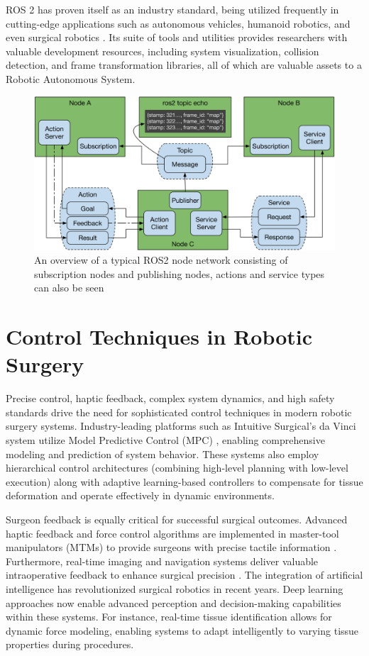 ROS 2 has proven itself as an industry standard, being utilized frequently in cutting-edge applications such as autonomous vehicles, humanoid robotics, and even surgical robotics \cite{Chen2013OpenSource}. Its suite of tools and utilities provides researchers with valuable development resources, including system visualization, collision detection, and frame transformation libraries, all of which are valuable assets to a Robotic Autonomous System.


\begin{figure}[H]
    \centering
    \includegraphics[width=1\linewidth]{figures/ROS2.png}
    \caption{An overview of a typical ROS2 node network consisting of subscription nodes and publishing nodes, actions and service types can also be seen \cite{doi:10.1126/scirobotics.abm6074}}
    \label{fig:ROS2}
\end{figure}


\section{Control Techniques in Robotic Surgery}

Precise control, haptic feedback, complex system dynamics, and high safety standards drive the need for sophisticated control techniques in modern robotic surgery systems. Industry-leading platforms such as Intuitive Surgical's da Vinci system utilize Model Predictive Control (MPC) \cite{Kazanzides2014DVRK}, enabling comprehensive modeling and prediction of system behavior. These systems also employ hierarchical control architectures (combining high-level planning with low-level execution) along with adaptive learning-based controllers to compensate for tissue deformation and operate effectively in dynamic environments.

Surgeon feedback is equally critical for successful surgical outcomes. Advanced haptic feedback and force control algorithms are implemented in master-tool manipulators (MTMs) to provide surgeons with precise tactile information \cite{Okamura2001HapticSurgery}. Furthermore, real-time imaging and navigation systems deliver valuable intraoperative feedback to enhance surgical precision \cite{Maier2015ImageGuidedSurgery}. The integration of artificial intelligence has revolutionized surgical robotics in recent years. Deep learning approaches now enable advanced perception and decision-making capabilities within these systems. For instance, real-time tissue identification \cite{Wang2020DeepLearningTissue} allows for dynamic force modeling, enabling systems to adapt intelligently to varying tissue properties during procedures.

